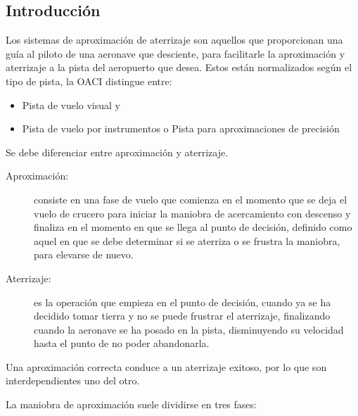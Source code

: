 

\subsection{Introducción}
\label{06.01.introduccion}

Los sistemas de aproximación de aterrizaje son aquellos que proporcionan una guía al piloto de
una aeronave que desciente, para facilitarle la aproximación y aterrizaje a la pista del aeropuerto que
desea. Estos están normalizados según el tipo de pista, la OACI distingue entre:

\begin{itemize}
\item Pista de vuelo visual y
\item Pista de vuelo por instrumentos o Pista para aproximaciones de precisión
\end{itemize}

Se debe diferenciar entre aproximación y aterrizaje.

\begin{description}
\item [Aproximación:] consiste en una fase
de vuelo que comienza en el momento que se deja el vuelo de crucero para iniciar la maniobra de
acercamiento con descenso y finaliza en el momento en que se llega al punto de decisión, definido
como aquel en que se debe determinar si se aterriza o se frustra la maniobra, para elevarse de nuevo.

\item[Aterrizaje:]  es la operación que empieza en el punto de decisión, cuando ya se ha
  decidido tomar tierra y no se puede frustrar el aterrizaje, finalizando cuando la aeronave
  se ha posado en la pista, disminuyendo su velocidad hasta el punto de no poder abandonarla.
\end{description}

Una aproximación correcta conduce a un aterrizaje exitoso, por lo que son interdependientes uno
del otro.

La maniobra de aproximación suele dividirse en tres fases:

